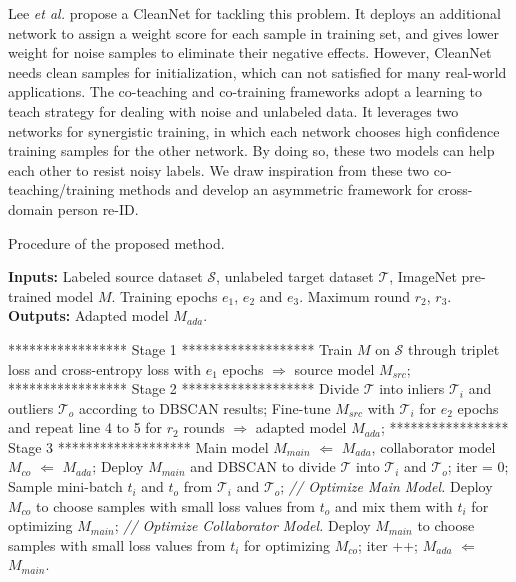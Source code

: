 \documentclass[letterpaper]{article} \usepackage{aaai20}  \usepackage{times}  \usepackage{helvet} \usepackage{courier}  \usepackage[hyphens]{url}  \usepackage{graphicx} \urlstyle{rm} \def\UrlFont{\rm}  \usepackage{graphicx}  \frenchspacing  \setlength{\pdfpagewidth}{8.5in}  \setlength{\pdfpageheight}{11in}  \usepackage{color}
\begin{document}
Lee \emph{et al.} \cite{lee2018cleannet} propose a CleanNet for tackling this problem. It deploys an additional network to assign a weight score for each sample in training set, and gives lower weight for noise samples to eliminate their negative effects. However, CleanNet needs clean samples for initialization, which can not satisfied for many real-world applications. The co-teaching and co-training frameworks \cite{han2018co,ma2017self} adopt a learning to teach strategy for dealing with noise and unlabeled data. It leverages two networks for synergistic training, in which each network chooses high confidence training samples for the other network. By doing so, these two models can help each other to resist noisy labels. We draw inspiration from these two co-teaching/training methods and develop an asymmetric framework for cross-domain person re-ID.



\begin{algorithm}[!ht]
  \caption{Procedure of the proposed method.}
  \label{alg:asyCo}
  \textbf{Inputs:} Labeled source dataset $\mathcal{S}$, unlabeled target dataset $\mathcal{T}$, 
  ImageNet pre-trained model $M$. Training epochs $e_{1}$, $e_{2}$ and $e_{3}$. Maximum round $r_2$, $r_3$. \\
  \textbf{Outputs:} Adapted model $M_{ada}$. \\
  \begin{algorithmic}[1]
    \STATE ****************** Stage 1 *******************
    \STATE Train $M$ on $\mathcal{S}$ through triplet loss and cross-entropy loss with $e_{1}$ epochs $\Rightarrow$ source model $M_{src}$;
    \STATE ****************** Stage 2 *******************
    \STATE Divide $\mathcal{T}$ into inliers $\mathcal{T}_{i}$ and outliers $\mathcal{T}_{o}$ according 
    to DBSCAN results;
    \STATE Fine-tune $M_{src}$ with $\mathcal{T}_{i}$ for $e_{2}$ epochs and repeat line 4 to 5 for $r_2$ rounds $\Rightarrow$ adapted model $M_{ada}$;
    \STATE ****************** Stage 3 *******************
    \STATE Main model $M_{main}$ $\Leftarrow$ $M_{ada}$, collaborator model $M_{co}$ $\Leftarrow$ $M_{ada}$;
      \STATE Deploy $M_{main}$ and DBSCAN to divide $\mathcal{T}$ into $\mathcal{T}_{i}$ and $\mathcal{T}_{o}$;
        \STATE iter = 0;
        \REPEAT
          \STATE Sample mini-batch $t_{i}$ and $t_{o}$ from $\mathcal{T}_{i}$ and $\mathcal{T}_{o}$;
            \STATE \textit{// Optimize Main Model.}
            \STATE Deploy $M_{co}$ to choose samples with small loss values from $t_{o}$ and mix them with $t_{i}$ for optimizing $M_{main}$;
          \ELSE 
            \STATE \textit{// Optimize Collaborator Model.} 
            \STATE Deploy $M_{main}$ to choose samples with small loss values from $t_{i}$ for optimizing $M_{co}$;
          \ENDIF
        \STATE iter ++;
      \ENDFOR
    \ENDFOR
    \STATE $M_{ada}$ $\Leftarrow$ $M_{main}$.
  \end{algorithmic}
\end{algorithm}
\end{document}
